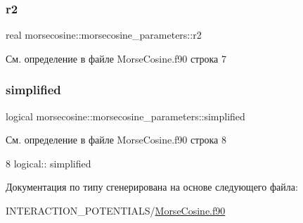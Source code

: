 \subsubsection{\texorpdfstring{r2}{r2}}
{\footnotesize\ttfamily real morsecosine\+::morsecosine\+\_\+parameters\+::r2}



См. определение в файле Morse\+Cosine.\+f90 строка 7

\mbox{\label{structmorsecosine_1_1morsecosine__parameters_a5a328e79441e4a4fa2c24603afb41511}} 
\subsubsection{\texorpdfstring{simplified}{simplified}}
{\footnotesize\ttfamily logical morsecosine\+::morsecosine\+\_\+parameters\+::simplified}



См. определение в файле Morse\+Cosine.\+f90 строка 8


\begin{DoxyCode}
8     \textcolor{keywordtype}{logical}:: simplified
\end{DoxyCode}


Документация по типу сгенерирована на основе следующего файла\+:\begin{DoxyCompactItemize}
\item 
I\+N\+T\+E\+R\+A\+C\+T\+I\+O\+N\+\_\+\+P\+O\+T\+E\+N\+T\+I\+A\+L\+S/\mbox{\hyperlink{_morse_cosine_8f90}{Morse\+Cosine.\+f90}}\end{DoxyCompactItemize}
